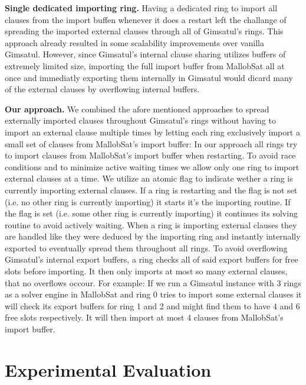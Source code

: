 \documentclass[12pt,a4paper,twoside]{scrartcl}
\numberwithin{equation}{section}
\begin{document}
\textbf{Single dedicated importing ring.} Having a dedicated ring to import all clauses from the import buffen whenever it does a restart left the challange of spreading the imported external clauses through all of Gimsatul's rings. This approach already resulted in some scalability improvements over vanilla Gimsatul. However, since Gimsatul's internal clause sharing utilizes buffers of extremely limited size, importing the full import buffer from MallobSat all at once and immediatly exporting them internally in Gimsatul would dicard many of the external clauses by overflowing internal buffers.

\textbf{Our approach.} We combined the afore mentioned approaches to spread externally imported clauses throughout Gimsatul's rings without having to import an external clause multiple times by letting each ring exclusively import a small set of clauses from MallobSat's import buffer: 
In our approach all rings try to import clauses from MallobSat's import buffer when restarting. To avoid race conditions and to minimize active waiting times we allow only one ring to import external clauses at a time. We utilize an atomic flag to indicate wether a ring is currently importing external clauses. If a ring is restarting and the flag is not set (i.e. no other ring is currently importing) it starts it's the importing routine. If the flag is set (i.e. some other ring is currently importing) it continues its solving routine to avoid actively waiting. 
When a ring is importing external clauses they are handled like they were deduced by the importing ring and instantly internally exported to eventually spread them throughout all rings. 
To avoid overflowing Gimsatul's internal export buffers, a ring checks all of said export buffers for free slots before importing. It then only imports at most so many external clauses, that no overflows occour. For example: If we run a Gimsatul instance with 3 rings as a solver engine in MallobSat and ring 0 tries to import some external clauses it will check its export buffers for ring 1 and 2 and might find them to have 4 and 6 free slots respectively. It will then import at most 4 clauses from MallobSat's import buffer.


\newpage
\section{Experimental Evaluation}
\end{document}
